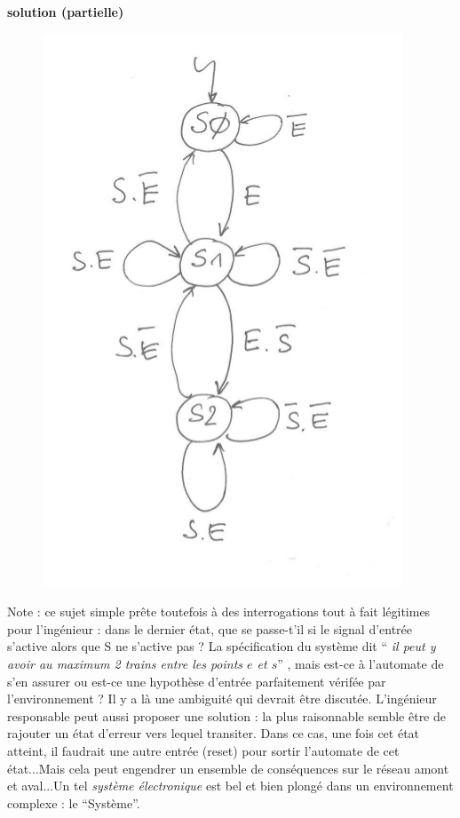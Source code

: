 \documentclass[a4paper,11pt]{article}
\begin{document}
{\bf solution (partielle)}

\begin{figure}[!h]
\begin{center}
\includegraphics[scale=0.4]{./sol5-1.png}
\end{center}
\end{figure}

Note : ce sujet simple prête toutefois à des interrogations tout à fait légitimes pour l'ingénieur : dans le dernier état, que se passe-t'il si le signal d'entrée s'active alors que S ne s'active pas ? La spécification du système dit ``{ \it  il peut y avoir au maximum 2 trains entre les points $e$ et $s$}'' , mais est-ce à l'automate de s'en assurer ou est-ce une hypothèse d'entrée parfaitement vérifée par l'environnement ? Il y a là une ambiguité qui devrait être discutée. L'ingénieur responsable peut aussi proposer une solution : la plus raisonnable semble être de rajouter un état d'erreur vers lequel transiter. Dans ce cas, une fois cet état atteint, il faudrait une autre entrée (reset) pour sortir l'automate de cet état...Mais cela peut engendrer un ensemble de conséquences sur le réseau amont et aval...Un tel {\it système électronique} est bel et bien plongé dans un environnement complexe : le ``Système''.
\end{document}
